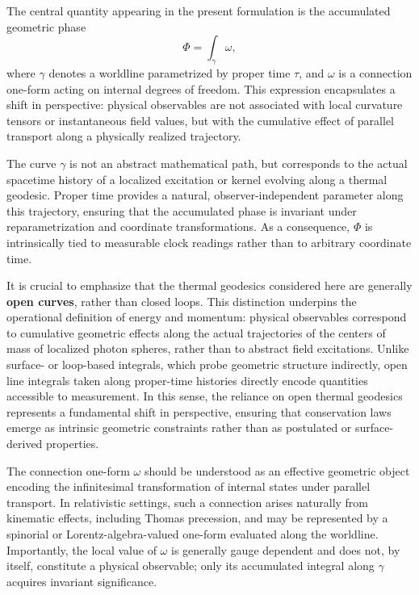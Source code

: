\documentclass[%
 reprint,
 amsmath,amssymb,
 aps,
 prb,
]{revtex4-2}
\numberwithin{equation}{section}
\begin{document}
The central quantity appearing in the present formulation is the accumulated geometric phase
\begin{equation}
\Phi = \int_{\gamma} \omega ,
\end{equation}
where $\gamma$ denotes a worldline parametrized by proper time $\tau$, and $\omega$ is a connection one-form acting on internal degrees of freedom. This expression encapsulates a shift in perspective: physical observables are not associated with local curvature tensors or instantaneous field values, but with the cumulative effect of parallel transport along a physically realized trajectory.

The curve $\gamma$ is not an abstract mathematical path, but corresponds to the actual spacetime history of a localized excitation or kernel evolving along a thermal geodesic. Proper time provides a natural, observer-independent parameter along this trajectory, ensuring that the accumulated phase is invariant under reparametrization and coordinate transformations. As a consequence, $\Phi$ is intrinsically tied to measurable clock readings rather than to arbitrary coordinate time.

It is crucial to emphasize that the thermal geodesics considered here are generally \textbf{open curves}, rather than closed loops. This distinction underpins the operational definition of energy and momentum: physical observables correspond to cumulative geometric effects along the actual trajectories of the centers of mass of localized photon spheres, rather than to abstract field excitations. Unlike surface- or loop-based integrals, which probe geometric structure indirectly, open line integrals taken along proper-time histories directly encode quantities accessible to measurement. In this sense, the reliance on open thermal geodesics represents a fundamental shift in perspective, ensuring that conservation laws emerge as intrinsic geometric constraints rather than as postulated or surface-derived properties.

The connection one-form $\omega$ should be understood as an effective geometric object encoding the infinitesimal transformation of internal states under parallel transport. In relativistic settings, such a connection arises naturally from kinematic effects, including Thomas precession, and may be represented by a spinorial or Lorentz-algebra-valued one-form evaluated along the worldline. Importantly, the local value of $\omega$ is generally gauge dependent and does not, by itself, constitute a physical observable; only its accumulated integral along $\gamma$ acquires invariant significance.
\end{document}
